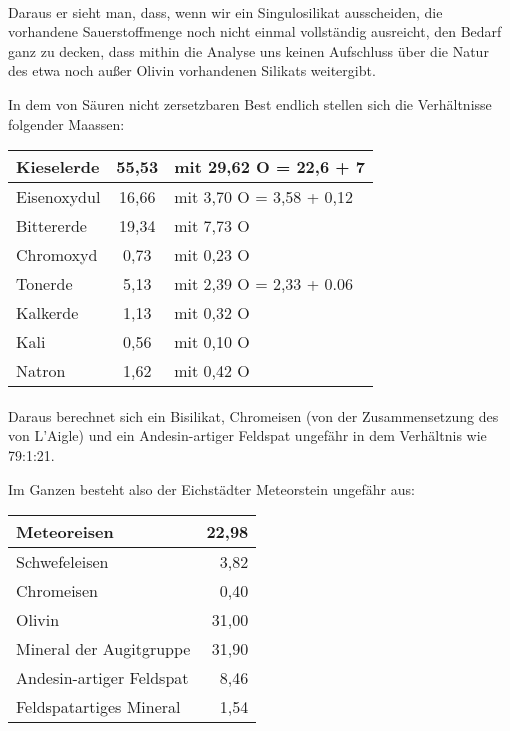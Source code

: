 \documentclass[a4paper, 11pt, oneside]{article}
\begin{document}
\paragraph{}
Daraus er sieht man, dass, wenn wir ein Singulosilikat ausscheiden, die vorhandene Sauerstoffmenge noch nicht einmal vollständig ausreicht, den Bedarf ganz zu decken, dass mithin die Analyse uns keinen Aufschluss über die Natur des etwa noch außer Olivin vorhandenen Silikats weitergibt.

In dem von Säuren nicht zersetzbaren Best endlich stellen sich die Verhältnisse folgender Maassen:
\begin{center}
\begin{tabular}{ |l|c|l| }
    \hline
    Kieselerde & 55,53 & mit 29,62 O = 22,6 + 7\\\hline
    Eisenoxydul & 16,66 & mit 3,70 O = 3,58 + 0,12\\\hline
    Bittererde & 19,34 & mit 7,73 O\\\hline
    Chromoxyd & 0,73 & mit 0,23 O\\\hline
    Tonerde & 5,13 & mit 2,39 O = 2,33 + 0.06\\\hline
    Kalkerde & 1,13 & mit 0,32 O\\\hline
    Kali & 0,56 & mit 0,10 O\\\hline
    Natron & 1,62 & mit 0,42 O\\
    \hline
\end{tabular}
\end{center}
\paragraph{}
Daraus berechnet sich ein Bisilikat, Chromeisen (von der Zusammensetzung des von L'Aigle) und ein Andesin-artiger Feldspat ungefähr in dem Verhältnis wie 79:1:21.

Im Ganzen besteht also der Eichstädter Meteorstein ungefähr aus:
\begin{center}
    \begin{tabular}{ |l|r| } 
    \hline
    Meteoreisen & 22,98\\\hline
    Schwefeleisen & 3,82\\\hline
    Chromeisen & 0,40\\\hline
    Olivin & 31,00\\\hline
    Mineral der Augitgruppe & 31,90\\\hline
    Andesin-artiger Feldspat & 8,46\\\hline
    Feldspatartiges Mineral & 1,54\\
    \hline
    \end{tabular}
\end{center}
\end{document}
